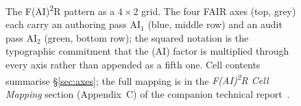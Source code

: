 \begin{figure}[!t]
\caption{The F(AI)\textsuperscript{2}R pattern as a $4 \times 2$
grid. The four FAIR axes (top, grey) each carry an authoring pass
$\mathrm{AI}_{1}$ (blue, middle row) and an audit pass
$\mathrm{AI}_{2}$ (green, bottom row); the squared notation is the
typographic commitment that the (AI) factor is multiplied through
every axis rather than appended as a fifth one. Cell contents
summarise \S\ref{sec:axes}; the full mapping is in the
\emph{F(AI)\textsuperscript{2}R Cell Mapping} section
(Appendix~C) of the companion technical
report~\cite{krebs2026faiarcompanion}.}
\label{fig:axes}
\end{figure}

